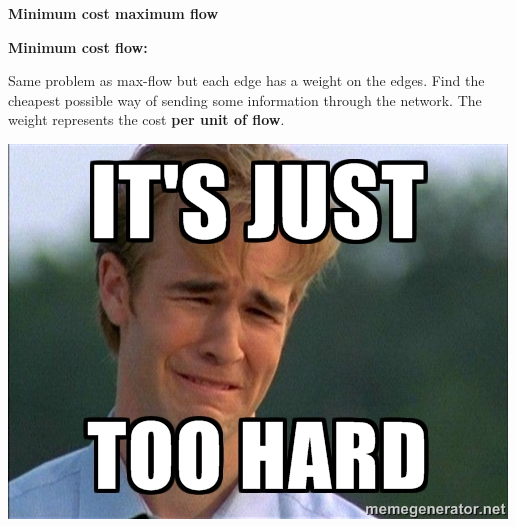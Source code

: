 \documentclass{beamer}
\begin{document}
\begin{frame}
\begin{center}
{\color{black} \huge{\textbf{Minimum cost maximum flow}}}
\end{center}
\end{frame}

\begin{frame}

\textbf{Minimum cost flow:}

\vspace{0.5cm}

Same problem as max-flow but each edge has a weight on the edges. Find the cheapest possible
way of sending some information through the network. The weight represents the cost \textbf{per unit of flow}.

\pause

\begin{center}
\includegraphics[scale = 0.5]{hard.jpg}
\end{center}

\end{frame}
\end{document}
